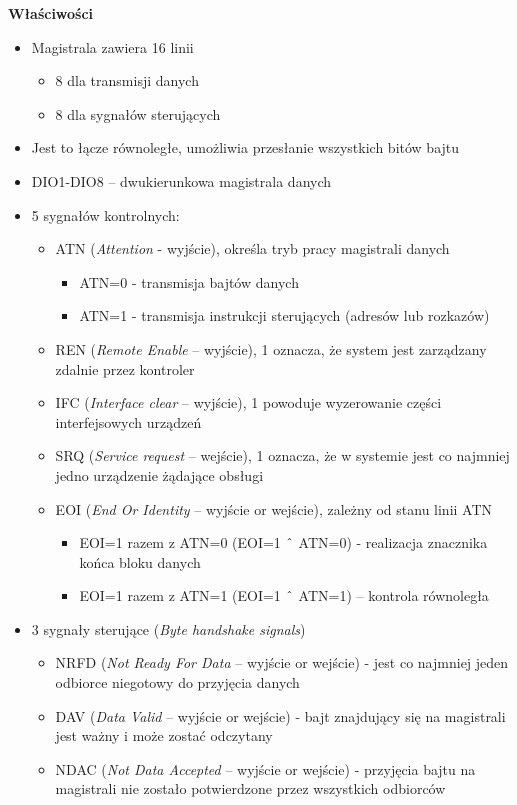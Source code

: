 \textbf{Właściwości}
\begin{itemize}
	\item Magistrala zawiera 16 linii
	\begin{itemize}
		\item 8 dla transmisji danych
		\item 8 dla sygnałów sterujących
	\end{itemize}
	\item Jest to łącze równoległe, umożliwia przesłanie wszystkich bitów bajtu
	\item DIO1-DIO8 – dwukierunkowa magistrala danych
	\item 5 sygnałów kontrolnych:
	\begin{itemize}
		\item ATN (\emph{Attention} - wyjście), określa tryb pracy magistrali danych
		\begin{itemize}
			\item ATN=0 - transmisja bajtów danych
			\item ATN=1 - transmisja instrukcji sterujących (adresów lub rozkazów)
		\end{itemize}
		\item REN (\emph{Remote Enable} – wyjście), 1 oznacza, że system jest zarządzany zdalnie przez kontroler
		\item IFC (\emph{Interface clear} – wyjście), 1 powoduje wyzerowanie części interfejsowych urządzeń
		\item SRQ (\emph{Service request} – wejście), 1 oznacza, że w systemie jest co najmniej jedno urządzenie żądające obsługi
		\item EOI (\emph{End Or Identity} – wyjście or wejście), zależny od stanu linii ATN
		\begin{itemize}
			\item EOI=1 razem z ATN=0 (EOI=1 $\XOR$ ATN=0) - realizacja znacznika końca bloku danych
			\item EOI=1 razem z ATN=1 (EOI=1 $\XOR$ ATN=1) – kontrola równoległa
		\end{itemize}
	\end{itemize}
	\item 3 sygnały sterujące (\emph{Byte handshake signals})
	\begin{itemize}
		\item NRFD (\emph{Not Ready For Data} – wyjście or wejście) - jest co najmniej jeden odbiorce niegotowy do przyjęcia danych
		\item DAV (\emph{Data Valid} – wyjście or wejście) - bajt znajdujący się na magistrali jest ważny i może zostać odczytany
		\item NDAC (\emph{Not Data Accepted} – wyjście or wejście) - przyjęcia bajtu na magistrali nie zostało potwierdzone przez wszystkich odbiorców
	\end{itemize}
\end{itemize}
\newpage
